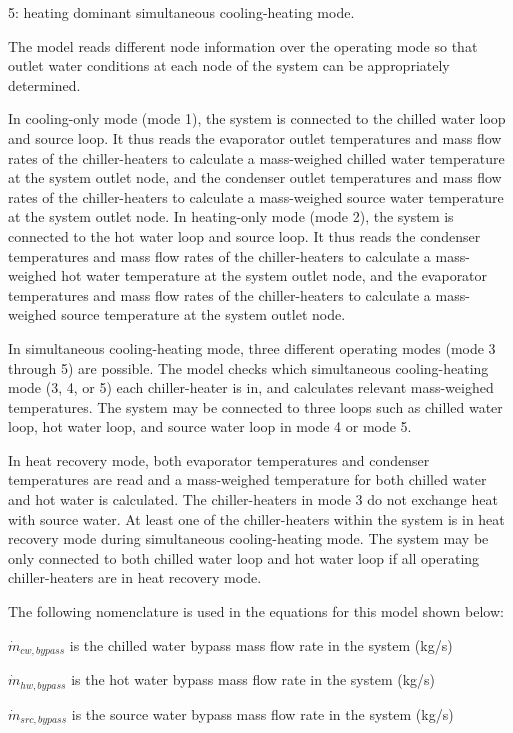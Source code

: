 5: heating dominant simultaneous cooling-heating mode.

The model reads different node information over the operating mode so that outlet water conditions at each node of the system can be appropriately determined.

In cooling-only mode (mode 1), the system is connected to the chilled water loop and source loop. It thus reads the evaporator outlet temperatures and mass flow rates of the chiller-heaters to calculate a mass-weighed chilled water temperature at the system outlet node, and the condenser outlet temperatures and mass flow rates of the chiller-heaters to calculate a mass-weighed source water temperature at the system outlet node. In heating-only mode (mode 2), the system is connected to the hot water loop and source loop. It thus reads the condenser temperatures and mass flow rates of the chiller-heaters to calculate a mass-weighed hot water temperature at the system outlet node, and the evaporator temperatures and mass flow rates of the chiller-heaters to calculate a mass-weighed source temperature at the system outlet node.

In simultaneous cooling-heating mode, three different operating modes (mode 3 through 5) are possible. The model checks which simultaneous cooling-heating mode (3, 4, or 5) each chiller-heater is in, and calculates relevant mass-weighed temperatures. The system may be connected to three loops such as chilled water loop, hot water loop, and source water loop in mode 4 or mode 5.

In heat recovery mode, both evaporator temperatures and condenser temperatures are read and a mass-weighed temperature for both chilled water and hot water is calculated. The chiller-heaters in mode 3 do not exchange heat with source water. At least one of the chiller-heaters within the system is in heat recovery mode during simultaneous cooling-heating mode. The system may be only connected to both chilled water loop and hot water loop if all operating chiller-heaters are in heat recovery mode.

The following nomenclature is used in the equations for this model shown below:

\({\dot m_{cw,bypass}}\) is the chilled water bypass mass flow rate in the system (kg/s)

\({\dot m_{hw,bypass}}\) is the hot water bypass mass flow rate in the system (kg/s)

\({\dot m_{src,bypass}}\) is the source water bypass mass flow rate in the system (kg/s)

